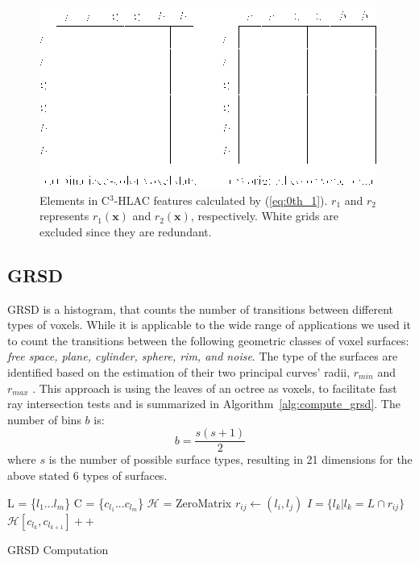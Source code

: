 \documentclass[a4paper, 10 pt, conference]{sty/ieeeconf}
\def\cH{\mathcal{H}}
\begin{document}
\begin{figure}[tb!]
  \begin{center}
    \includegraphics[width=.99\columnwidth]{figures/colorCHLAC/Eq3_in_colorCHLAC.png}
  \caption{Elements in C$^3$-HLAC features calculated by (\ref{eq:0th_1}). $r_1$ and $r_2$ represents $r_1(\bm{x})$ and $r_2(\bm{x})$, respectively. White grids are excluded since they are redundant.}
  \label{fig:eq3_colorCHLAC}
\end{center}
\end{figure}

\subsection{GRSD}
\label{sec:grsd}
GRSD is a histogram, that counts the number of transitions between different types of voxels.
While it is applicable to the wide range of applications we used it to count the transitions between 
the following geometric classes of voxel surfaces: \emph{free space, plane, cylinder, sphere, rim, and noise}.
The type of the surfaces are identified based on the estimation of their
two principal curves' radii, $r_{min}$ and $r_{max}$ \cite{Marton10IROS}. 
This approach is using the leaves of an octree as voxels, to facilitate fast ray intersection
tests and is summarized in Algorithm~\ref{alg:compute_grsd}.
The number of bins $b$ is:
\begin{equation}
b=\frac{s(s+1)}{2}
\end{equation}
where $s$ is the number of possible surface types,
resulting in 21 dimensions for the above stated 6 types of surfaces.

\begin{algorithm}[htb!]
L = \{$l_{1}...l_{m}$\} 
C = \{$c_{l_1}...c_{l_m}$\} 
$\cH$ = ZeroMatrix 
  {
    {
      $r_{ij} \leftarrow (l_{i},l_{j})$ 
      $I = \{l_{k}|l_{k} = L \cap r_{ij}\}$ 
      {
        $\cH[c_{l_k},c_{l_{k+1}}]++$ 
      }
    }
  }
  \caption{GRSD Computation}
  \label{alg:compute_grsd}
\end{algorithm}
\end{document}
